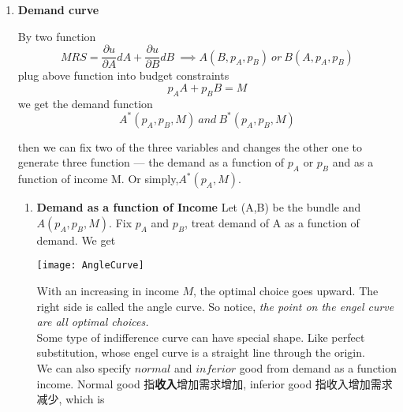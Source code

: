 \documentclass[10pt]{article}
\newenvironment{changemargin}[2]{%
  \begin{list}{}{%
    \setlength{\topsep}{0pt}%
    \setlength{\leftmargin}{#1}%
    \setlength{\rightmargin}{#2}%
    \setlength{\listparindent}{\parindent}%
    \setlength{\itemindent}{\parindent}%
    \setlength{\parsep}{\parskip}%
  }%
  \item[]}{\end{list}}
\begin{document}
\begin{changemargin}{-0.125in}{0in}
\begin{enumerate}
         \medskip
         
         \item \textbf{Demand curve}
          
          \smallskip
          
          By two function 
          \[
          MRS = \frac{\partial u}{\partial A}dA + \frac{\partial u}{\partial B}dB\:\implies A(B,p_A,p_B)\: or \: B(A,p_A,p_B)
          \]
          plug above function into budget constraints 
          \[
          p_AA+p_BB = M
          \]
          we get the demand function
          \[
          A^*(p_A,p_B,M)\: and \: B^*(p_A,p_B,M)
          \]
         
          then we can fix two of the three variables and changes the other one to generate three function --- the demand as a function of $p_A$ or $p_B$ and as a function of income M. Or simply,$A^*(p_A,M)$.
          
          
          
          
          \smallskip
          
           \begin{enumerate}
            \item 
            
            \textbf{Demand as a function of Income}
            Let (A,B) be the bundle and $A(p_A,p_B,M)$. Fix $p_A$ and $p_B$, treat demand of A as a function of demand. We get 
            
            \bigskip
            
            \bigskip
            
            \begin{center}
            	\texttt{[image: AngleCurve]}
            \end{center}
            
            \medskip
            
            With an increasing in income $M$, the optimal choice goes upward. The right side is called the angle curve. So notice, \textit{the point on the engel curve are all optimal choices.}\\
           
            
            Some type of indifference curve can have special shape. Like perfect substitution, whose engel curve is a straight line through the origin. \\
            
            We can also specify $normal$ and $inferior$ good from demand as a function income. Normal good 指\textbf{收入}增加需求增加, inferior good 指收入增加需求减少, which is 
            

\end{enumerate}
\end{enumerate}
\end{changemargin}
\end{document}
